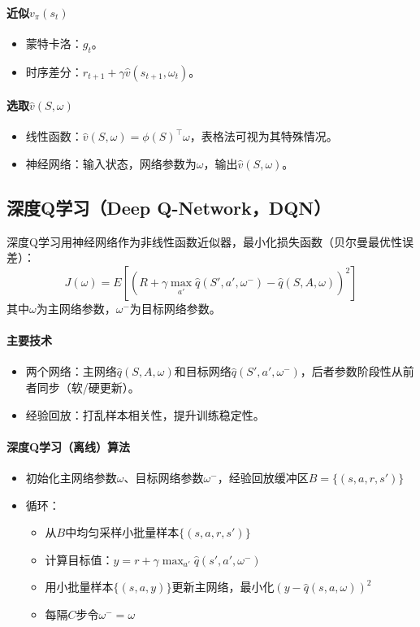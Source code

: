 \documentclass[
12pt, %
a4paper, 
oneside, %
headinclude,footinclude, %
]{scrartcl}
\begin{document}
\paragraph{近似$ v_\pi(s_t) $}
\begin{itemize}
\item 蒙特卡洛：$ g_t $。
\item 时序差分：$ r_{t + 1} + \gamma \hat{v}(s_{t + 1}, \omega_t) $。
\end{itemize}
\paragraph{选取$ \hat{v}(S, \omega) $}
\begin{itemize}
\item 线性函数：$ \hat{v}(S, \omega) = \phi(S)^\top \omega $，表格法可视为其特殊情况。
\item 神经网络：输入状态，网络参数为$ \omega $，输出$ \hat{v}(S, \omega) $。
\end{itemize}
\subsection{深度Q学习（Deep Q-Network，DQN）}
深度Q学习用神经网络作为非线性函数近似器，最小化损失函数（贝尔曼最优性误差）：
$$
J(\omega) = E[(R + \gamma \max_{a'} \hat{q}(S', a', \omega^-) - \hat{q}(S, A, \omega))^2]
$$
其中$ \omega $为主网络参数，$ \omega^- $为目标网络参数。
\paragraph{主要技术}
\begin{itemize}
\item 两个网络：主网络$ \hat{q}(S, A, \omega) $和目标网络$ \hat{q}(S', a', \omega^-) $，后者参数阶段性从前者同步（软/硬更新）。
\item 经验回放：打乱样本相关性，提升训练稳定性。
\end{itemize}
\paragraph{深度Q学习（离线）算法}
\begin{itemize}
\item 初始化主网络参数$ \omega $、目标网络参数$ \omega^- $，经验回放缓冲区$ B = \{(s, a, r, s')\} $
\item 循环：
\begin{itemize}
\item 从$ B $中均匀采样小批量样本$ \{(s, a, r, s')\} $
\item 计算目标值：$ y = r + \gamma \max_{a'} \hat{q}(s', a', \omega^-) $
\item 用小批量样本$ \{(s, a, y)\} $更新主网络，最小化$ (y - \hat{q}(s, a, \omega))^2 $
\item 每隔$ C $步令$ \omega^- = \omega $
\end{itemize}
\end{itemize}
\end{document}
